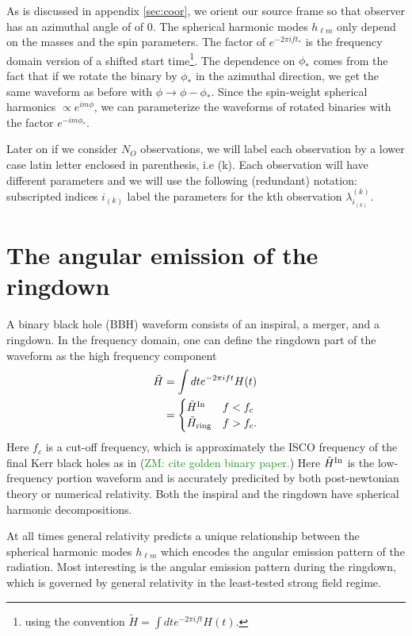 \documentclass[aps,prd,amsmath,showpacs,amssymb,superscriptaddress,nofootinbib,longbibliography,eqsecnum,preprintnumbers]{revtex4-1}
\newcommand{\zach}[1]{\textcolor{ForestGreen}{#1}}
\begin{document}
As is discussed in appendix \ref{sec:coor}, we orient our source frame so that observer has an azimuthal angle of of $0$.
The spherical harmonic modes $h_{\ell m}$ only depend on the masses and the spin parameters. The factor of $e^{-2\pi if t_*}$ is the frequency domain version of a shifted start time\footnote{using the convention $\tilde H= \int dt e^{-2\pi i ft}H(t)$.}. The dependence on $\phi_*$ comes from the fact that if we rotate the binary by $\phi_*$ in the azimuthal direction, we get the same waveform as before with $\phi \to \phi-\phi_*$. Since the spin-weight spherical harmonics $\propto e^{im \phi}$, we can parameterize the waveforms of rotated binaries with the factor $e^{-im\phi_*}$.

Later on if we consider $N_O$ observations, we will label each observation by a lower case latin letter enclosed in parenthesis, i.e (k). Each observation will have different parameters and we will use the following (redundant) notation: subscripted indices $i_{(k)}$ label the parameters for the kth observation $\lambda^{(k)}_{i_{(k)}}$.

\section{The angular emission of the ringdown}

A binary black hole (BBH) waveform   consists of an inspiral, a merger, and a ringdown. In the frequency domain, one can define the ringdown part of the waveform as the high frequency component 
\begin{align}
\tilde H&=\int dt e^{-2\pi i f t} H(t) 
\nonumber \\
&=
\begin{cases}
\tilde H^{\rm In}& f<f_c \\
\tilde H_{\rm ring}& f>f_c.
\end{cases}
\end{align}
Here $f_c$ is a cut-off frequency, which is approximately the ISCO frequency of the final Kerr black holes as in (\zach{ZM: cite golden binary paper.})
Here $\tilde H ^{\rm In}$ is the low-frequency portion waveform and is accurately predicited by both post-newtonian theory or numerical relativity. Both the inspiral and the ringdown have spherical harmonic decompositions. 

At all times general relativity predicts a unique relationship between the spherical harmonic modes $h_{\ell m}$ which encodes the angular emission pattern of the radiation. Most interesting is the angular emission pattern during the ringdown, which is governed by general relativity in the least-tested strong field regime.
\end{document}
